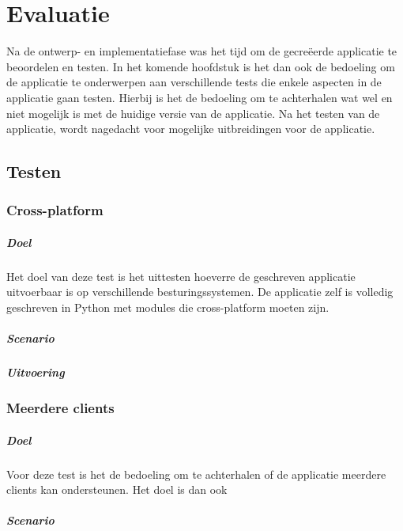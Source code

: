 \chapter{Evaluatie}
Na de ontwerp- en implementatiefase was het tijd om de gecreëerde applicatie te beoordelen en testen.
In het komende hoofdstuk is het dan ook de bedoeling om de applicatie te onderwerpen aan verschillende tests die enkele aspecten in de applicatie gaan testen.
Hierbij is het de bedoeling om te achterhalen wat wel en niet mogelijk is met de huidige versie van de applicatie.
Na het testen van de applicatie, wordt nagedacht voor mogelijke uitbreidingen voor de applicatie.

\section{Testen}
\subsection{Cross-platform}
\paragraph{Doel}
Het doel van deze test is het uittesten hoeverre de geschreven applicatie uitvoerbaar is op verschillende besturingssystemen.
De applicatie zelf is volledig geschreven in Python met modules die cross-platform moeten zijn.

\paragraph{Scenario}


\paragraph{Uitvoering}


\subsection{Meerdere clients}
\paragraph{Doel}
Voor deze test is het de bedoeling om te achterhalen of de applicatie meerdere clients kan ondersteunen.
Het doel is dan ook 

\paragraph{Scenario}


